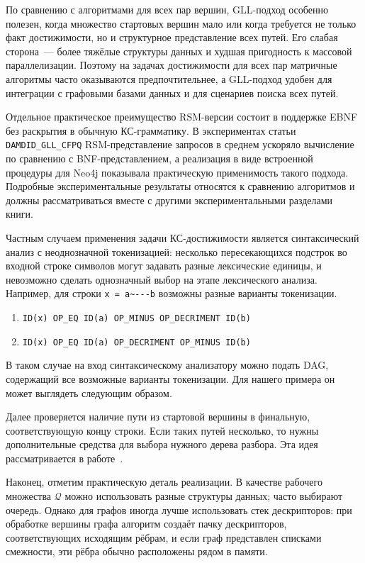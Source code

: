 По сравнению с алгоритмами для всех пар вершин, GLL-подход особенно полезен, когда множество стартовых вершин мало или когда требуется не только факт достижимости, но и структурное представление всех путей. Его слабая сторона~--- более тяжёлые структуры данных и худшая пригодность к массовой параллелизации. Поэтому на задачах достижимости для всех пар матричные алгоритмы часто оказываются предпочтительнее, а GLL-подход удобен для интеграции с графовыми базами данных и для сценариев поиска всех путей.

Отдельное практическое преимущество RSM-версии состоит в поддержке EBNF без раскрытия в обычную КС-грамматику. В экспериментах статьи \texttt{DAMDID\_GLL\_CFPQ} RSM-представление запросов в среднем ускоряло вычисление по сравнению с BNF-представлением, а реализация в виде встроенной процедуры для Neo4j показывала практическую применимость такого подхода. Подробные экспериментальные результаты относятся к сравнению алгоритмов и должны рассматриваться вместе с другими экспериментальными разделами книги.

Частным случаем применения задачи КС-достижимости является синтаксический анализ с неоднозначной токенизацией: несколько пересекающихся подстрок во входной строке символов могут задавать разные лексические единицы, и невозможно сделать однозначный выбор на этапе лексического анализа. Например, для строки \verb|x = a~---b| возможны разные варианты токенизации.
\begin{enumerate}
  \item \verb|ID(x) OP_EQ ID(a) OP_MINUS OP_DECRIMENT ID(b)|
  \item \verb|ID(x) OP_EQ ID(a) OP_DECRIMENT OP_MINUS ID(b)|
\end{enumerate}

В таком случае на вход синтаксическому анализатору можно подать DAG, содержащий все возможные варианты токенизации. Для нашего примера он может выглядеть следующим образом.

\begin{center}
    
\end{center}

Далее проверяется наличие пути из стартовой вершины в финальную, соответствующую концу строки. Если таких путей несколько, то нужны дополнительные средства для выбора нужного дерева разбора. Эта идея рассматривается в работе~.

Наконец, отметим практическую деталь реализации. В качестве рабочего множества $\mathcal{Q}$ можно использовать разные структуры данных; часто выбирают очередь. Однако для графов иногда лучше использовать стек дескрипторов: при обработке вершины графа алгоритм создаёт пачку дескрипторов, соответствующих исходящим рёбрам, и если граф представлен списками смежности, эти рёбра обычно расположены рядом в памяти.
